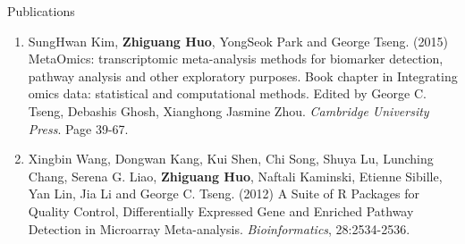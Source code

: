 \documentclass{resume} %
\begin{document}
\begin{rSection}{Publications}
\begin{enumerate}[noitemsep,topsep=0pt,resume]
\item SungHwan Kim,  {\bf Zhiguang Huo}, YongSeok Park and George Tseng.  (2015) MetaOmics: transcriptomic meta-analysis methods for biomarker detection, pathway analysis and other exploratory purposes. Book chapter in Integrating omics data: statistical and computational methods. Edited by George C. Tseng, Debashis Ghosh, Xianghong Jasmine Zhou. \emph{Cambridge University Press}. Page 39-67.

    \item Xingbin Wang, Dongwan Kang, Kui Shen, Chi Song, Shuya Lu, Lunching Chang, Serena G. Liao, {\bf Zhiguang Huo}, Naftali Kaminski, Etienne Sibille, Yan Lin, Jia Li and George C. Tseng. (2012) A Suite of R Packages for Quality Control, Differentially Expressed Gene and Enriched Pathway Detection in Microarray Meta-analysis. \emph{Bioinformatics}, 28:2534-2536.

\end{enumerate}


\end{rSection}
\end{document}
